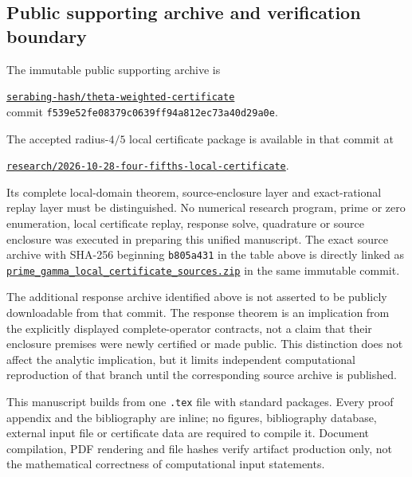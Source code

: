 \documentclass[11pt,a4paper]{article}
\numberwithin{equation}{section}
\theoremstyle{definition}\newtheorem{definition}[theorem]{Definition}
\theoremstyle{remark}\newtheorem{remark}[theorem]{Remark}
\begin{document}
\subsection{Public supporting archive and verification boundary}
The immutable public supporting archive is
\begin{center}\small
\href{https://github.com/serabing-hash/theta-weighted-certificate/tree/f539e52fe08379c0639ff94a812ec73a40d29a0e}{\texttt{serabing-hash/theta-weighted-certificate}}\\
commit \nolinkurl{f539e52fe08379c0639ff94a812ec73a40d29a0e}.
\end{center}
The accepted radius-$4/5$ local certificate package is available in that commit at
\begin{center}\small
\href{https://github.com/serabing-hash/theta-weighted-certificate/tree/f539e52fe08379c0639ff94a812ec73a40d29a0e/research/2026-10-28-four-fifths-local-certificate}{\texttt{research/2026-10-28-four-fifths-local-certificate}}.
\end{center}
Its complete local-domain theorem, source-enclosure layer and exact-rational replay layer must be distinguished. No numerical research program, prime or zero enumeration, local certificate replay, response solve, quadrature or source enclosure was executed in preparing this unified manuscript.
The exact source archive with SHA-256 beginning \texttt{b805a431} in the table above is directly linked as
\href{https://github.com/serabing-hash/theta-weighted-certificate/blob/f539e52fe08379c0639ff94a812ec73a40d29a0e/research/2026-10-28-four-fifths-local-certificate/prime_gamma_local_certificate_sources.zip}{\texttt{prime\_gamma\_local\_certificate\_sources.zip}} in the same immutable commit.

The additional response archive identified above is not asserted to be publicly downloadable from that commit. The response theorem is an implication from the explicitly displayed complete-operator contracts, not a claim that their enclosure premises were newly certified or made public. This distinction does not affect the analytic implication, but it limits independent computational reproduction of that branch until the corresponding source archive is published.

This manuscript builds from one \texttt{.tex} file with standard packages. Every proof appendix and the bibliography are inline; no figures, bibliography database, external input file or certificate data are required to compile it. Document compilation, PDF rendering and file hashes verify artifact production only, not the mathematical correctness of computational input statements.
\end{document}
